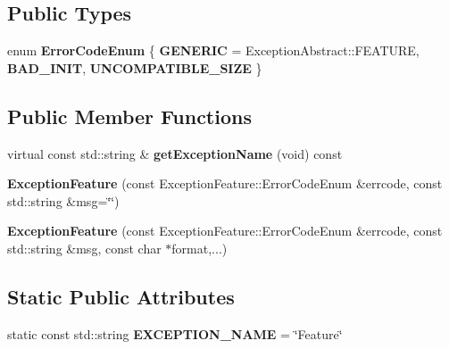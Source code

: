 \subsection*{Public Types}
\begin{DoxyCompactItemize}
\item 
\mbox{\label{classdynamic__graph_1_1ExceptionFeature_a0699b7c4631350c8c1c0eb39a11426f1}} 
enum {\bfseries Error\+Code\+Enum} \{ {\bfseries G\+E\+N\+E\+R\+IC} = Exception\+Abstract\+:\+:F\+E\+A\+T\+U\+RE, 
{\bfseries B\+A\+D\+\_\+\+I\+N\+IT}, 
{\bfseries U\+N\+C\+O\+M\+P\+A\+T\+I\+B\+L\+E\+\_\+\+S\+I\+ZE}
 \}
\end{DoxyCompactItemize}
\subsection*{Public Member Functions}
\begin{DoxyCompactItemize}
\item 
\mbox{\label{classdynamic__graph_1_1ExceptionFeature_a22989c5bbe6eefecef6988cd56dab002}} 
virtual const std\+::string \& {\bfseries get\+Exception\+Name} (void) const
\item 
\mbox{\label{classdynamic__graph_1_1ExceptionFeature_a76a3b0adc5f5881b8b3609ddf989f24a}} 
{\bfseries Exception\+Feature} (const Exception\+Feature\+::\+Error\+Code\+Enum \&errcode, const std\+::string \&msg=\char`\"{}\char`\"{})
\item 
\mbox{\label{classdynamic__graph_1_1ExceptionFeature_a88a704700091fa451ee9bc6db1ad793e}} 
{\bfseries Exception\+Feature} (const Exception\+Feature\+::\+Error\+Code\+Enum \&errcode, const std\+::string \&msg, const char $\ast$format,...)
\end{DoxyCompactItemize}
\subsection*{Static Public Attributes}
\begin{DoxyCompactItemize}
\item 
\mbox{\label{classdynamic__graph_1_1ExceptionFeature_a977865e1bf4940aed64bf434ec72bf18}} 
static const std\+::string {\bfseries E\+X\+C\+E\+P\+T\+I\+O\+N\+\_\+\+N\+A\+ME} = \char`\"{}Feature\char`\"{}
\end{DoxyCompactItemize}
